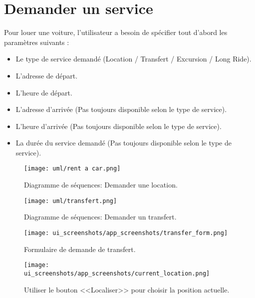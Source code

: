 \section{Demander un service}
Pour louer une voiture, l'utilisateur a besoin de spécifier tout d'abord les paramètres suivants :
\begin{itemize}
    \item Le type de service demandé (Location / Transfert / Excursion / Long Ride).
    \item L'adresse de départ.
    \item L'heure de départ.
    \item L'adresse d'arrivée (Pas toujours disponible selon le type de service).
    \item L'heure d'arrivée (Pas toujours disponible selon le type de service).
    \item La durée du service demandé (Pas toujours disponible selon le type de service).
\end{itemize}
\vspace{.5cm}
\begin{figure}[H]
    \centering
    \texttt{[image: uml/rent a car.png]}
    \vspace{.5cm}
    \caption{Diagramme de séquences: Demander une location.}
    \label{fig:seq_location}
\end{figure}
\vspace{.5cm}
\begin{figure}[H]
    \centering
    \texttt{[image: uml/transfert.png]}
    \vspace{.5cm}
    \caption{Diagramme de séquences: Demander un transfert.}
    \label{fig:seq_transfert}
\end{figure}
\vspace{.5cm}
\clearpage
\begin{multicols}{2}
    \begin{figure}[H]
        \centering
        \texttt{[image: ui\_screenshots/app\_screenshots/transfer\_form.png]}
        \captionsetup{justification=centering}
        \caption{Formulaire de demande de transfert.}
        \label{fig:app_transfer}
    \end{figure}
    \begin{figure}[H]
        \centering
        \texttt{[image: ui\_screenshots/app\_screenshots/current\_location.png]}
        \captionsetup{justification=centering}
        \caption{Utiliser le bouton <<Localiser>> pour choisir la position actuelle.}
        \label{fig:app_transfer_current_pos}
    \end{figure}
\end{multicols}
